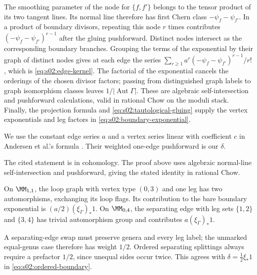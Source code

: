 \begin{prf}
The smoothing parameter of the node for $\{f,f'\}$ belongs to the
tensor product of its two tangent lines.  Its normal line therefore
has first Chern class $-\psi_f-\psi_{f'}$.  In a product of boundary
divisors, repeating this node $r$ times contributes
$(-\psi_f-\psi_{f'})^{r-1}$ after the gluing pushforward.
Distinct nodes intersect as the corresponding boundary branches.
Grouping the terms of the exponential by their graph of distinct
nodes gives at each edge the series
$\sum_{r\geq1}a^r(-\psi_f-\psi_{f'})^{r-1}/r!$, which is
\eqref{eq:s02:edge-kernel}.  The factorial of the exponential cancels
the orderings of the chosen divisor factors; passing from distinguished
graph labels to graph isomorphism classes leaves
$1/|\operatorname{Aut}\Gamma|$.
These are algebraic self-intersection and pushforward calculations,
valid in rational Chow on the moduli stack.  Finally, the projection
formula and \eqref{eq:s02:tautological-gluing} supply the vertex
exponentials and leg factors in \eqref{eq:s02:boundary-exponential}.
\end{prf}

\begin{rmk}
\label{rmk:s02:boundary-source}
We use the constant edge series $a$ and a vertex series linear with
coefficient $c$ in Andersen et al.'s formula
\cite[Lemma 3.10, (3.18)--(3.22)]{ABCDGLW23}.
Their weighted one-edge pushforward is our $\delta$.

The cited statement is in cohomology.  The proof above uses algebraic
normal-line self-intersection and pushforward, giving the stated
identity in rational Chow.
\end{rmk}

\begin{exm}
\label{exm:s02:one-edge-weights}
On $\MM_{1,1}$, the loop graph with vertex type $(0,3)$ and one leg
has two automorphisms, exchanging its loop flags.  Its contribution
to the bare boundary exponential is $(a/2)(\xi_\Gamma)_*1$.
On $\MM_{0,4}$, the separating edge with leg sets $\{1,2\}$ and
$\{3,4\}$ has trivial automorphism group and contributes
$a(\xi_\Gamma)_*1$.

A separating-edge swap must preserve genera and every leg label;
the unmarked equal-genus case therefore has weight $1/2$.
Ordered separating splittings always require a prefactor $1/2$,
since unequal sides occur twice.  This agrees with
$\delta=\frac12\xi_*1$ in \eqref{eq:s02:ordered-boundary}.
\end{exm}

